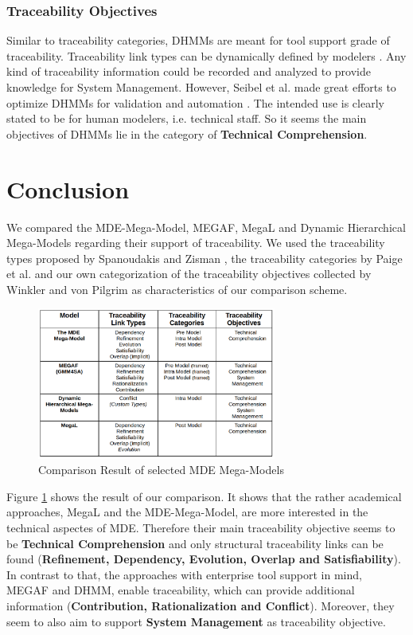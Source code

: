 \documentclass[runningheads,a4paper]{llncs}
\begin{document}
\subsubsection{Traceability Objectives}
Similar to traceability categories, DHMMs are meant for tool support grade of traceability.
Traceability link types can be dynamically defined by modelers \cite{DHMM}.
Any kind of traceability information could be recorded and analyzed to provide knowledge for System Management.
However, Seibel et al. made great efforts to optimize DHMMs for validation and automation \cite{DHMM}.
The intended use is clearly stated to be for human modelers, i.e. technical staff.
So it seems the main objectives of DHMMs lie in the category of \textbf{Technical Comprehension}.



\section{Conclusion}\label{sec:Conclusion}
We compared the MDE-Mega-Model, MEGAF, MegaL and Dynamic Hierarchical Mega-Models regarding their support of traceability.
We used the traceability types proposed by Spanoudakis and Zisman \cite{SpanoudakisAndZisman}, the traceability categories by Paige et al. \cite{PaigeEtAl} and our own categorization of the traceability objectives collected by Winkler and von Pilgrim \cite{TraceabilitySurvey} as characteristics of our comparison scheme.

\begin{figure}
\centering
\includegraphics[width=0.7\textwidth]{ComparisonMatrix.png}
\caption{Comparison Result of selected MDE Mega-Models }
\label{fig:Comparison-Result-of-selected-MDE-Mega-Models}
\end{figure}

Figure \ref{fig:Comparison-Result-of-selected-MDE-Mega-Models} shows the result of our comparison.
It shows that the rather academical approaches, MegaL and the MDE-Mega-Model, are more interested in the technical aspectes of MDE.
Therefore their main traceability objective seems to be \textbf{Technical Comprehension} and only structural traceability links can be found (\textbf{Refinement, Dependency, Evolution, Overlap and Satisfiability}). 
In contrast to that, the approaches with enterprise tool support in mind, MEGAF and DHMM, enable traceability, which can provide additional information (\textbf{Contribution, Rationalization and Conflict}).
Moreover, they seem to also aim to support \textbf{System Management} as traceability objective.
\end{document}
